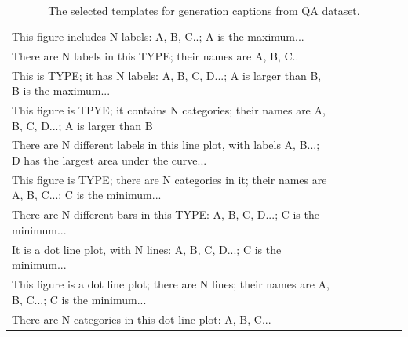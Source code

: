 \documentclass[11pt,a4paper]{article}
\begin{document}
\begin{table}[ht]
\begin{center}
\begin{tabular}{lcccccc}
\toprule[1.2pt]
This figure includes N labels: A, B, C..; A is the maximum...\\
There are N labels in this TYPE; their names are A, B, C..\\
This is TYPE; it has N labels: A, B, C, D...; A is larger than B, B is the maximum...\\
This figure is TPYE; it contains N categories; their names are A, B, C, D...; A is larger than B\\
There are N different labels in this line plot, with labels A, B...; D has the largest area under the curve...\\
This figure is TYPE; there are N categories in it; their names are A, B, C...; C is the minimum...\\
There are N different bars in this TYPE: A, B, C, D...; C is the minimum...\\
It is a dot line plot, with N lines: A, B, C, D...; C is the minimum...\\
This figure is a dot line plot; there are N lines; their names are A, B, C...; C is the minimum...\\
There are N categories in this dot line plot: A, B, C...\\
\bottomrule[1.2pt]
\end{tabular}
\caption{The selected templates for generation captions from QA dataset.}
\label{tab:example}
\end{center}
\end{table}
\end{document}
